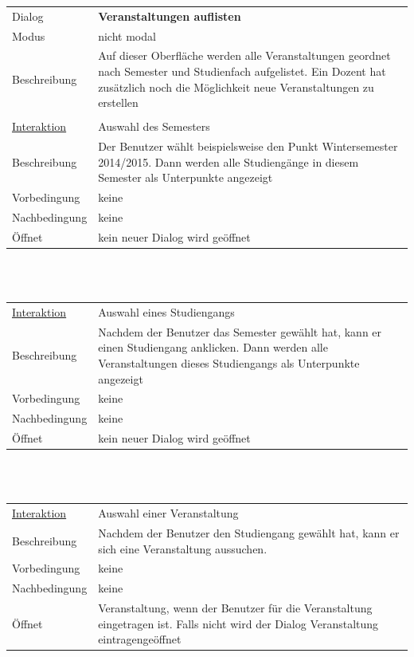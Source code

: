 \documentclass[12pt,a4paper]{article}
\begin{document}
{\begin{tabular}{l p{12cm}}
Dialog 	 & \textbf{Veranstaltungen auflisten} \\ 
Modus & nicht modal\\ 
Beschreibung   	 & Auf dieser Oberfläche werden alle Veranstaltungen geordnet nach Semester und Studienfach aufgelistet. Ein Dozent hat zusätzlich noch die Möglichkeit neue Veranstaltungen zu erstellen\\\\

\underline{Interaktion} 	 & Auswahl des Semesters\\ 
Beschreibung   	 & Der Benutzer wählt beispielsweise den Punkt Wintersemester 2014/2015. Dann werden alle Studiengänge in diesem Semester als Unterpunkte angezeigt\\
Vorbedingung	& keine \\
Nachbedingung	& keine \\
Öffnet			& kein neuer Dialog wird geöffnet\\
\end{tabular}\\\\ 

\begin{tabular}{l p{12cm}}
\underline{Interaktion} 	 & Auswahl eines Studiengangs\\ 
Beschreibung   	 & Nachdem der Benutzer das Semester gewählt hat, kann er einen Studiengang anklicken. Dann werden alle Veranstaltungen dieses Studiengangs als Unterpunkte angezeigt\\
Vorbedingung	& keine \\
Nachbedingung	& keine \\
Öffnet			& kein neuer Dialog wird geöffnet\\
\end{tabular}\\\\ 

\begin{tabular}{l p{12cm}}
\underline{Interaktion} 	 & Auswahl einer Veranstaltung\\ 
Beschreibung   	 & Nachdem der Benutzer den Studiengang gewählt hat, kann er sich eine Veranstaltung aussuchen.\\
Vorbedingung	& keine \\
Nachbedingung	& keine \\
Öffnet			& \glqq Veranstaltung\grqq, wenn der Benutzer für die Veranstaltung eingetragen ist. Falls nicht wird der Dialog \glqq Veranstaltung eintragen\grqq geöffnet \\
\end{tabular}\\\\
		
}
\end{document}
